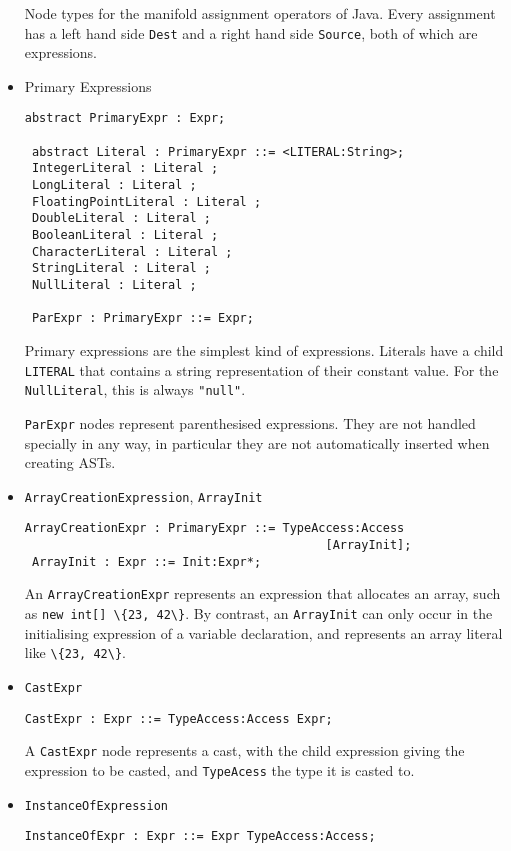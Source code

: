 \documentclass{article}
\newcommand{\nt}[1]{\texttt{#1}}
\newcommand{\child}[1]{\texttt{#1}}
\newcommand{\code}[1]{\lstinline$#1$}
\begin{document}
\begin{itemize}
  Node types for the manifold assignment operators of Java. Every assignment
  has a left hand side \nt{Dest} and a right hand side \nt{Source}, both
  of which are expressions.

\item Primary Expressions
  \begin{lstlisting}[frame=single]
 abstract PrimaryExpr : Expr;

 abstract Literal : PrimaryExpr ::= <LITERAL:String>;
 IntegerLiteral : Literal ;
 LongLiteral : Literal ;
 FloatingPointLiteral : Literal ;
 DoubleLiteral : Literal ;
 BooleanLiteral : Literal ;
 CharacterLiteral : Literal ;
 StringLiteral : Literal ;
 NullLiteral : Literal ;

 ParExpr : PrimaryExpr ::= Expr;
  \end{lstlisting}

  Primary expressions are the simplest kind of expressions. Literals
  have a child \nt{LITERAL} that contains a string representation of
  their constant value. For the \nt{NullLiteral}, this is always
  \code{"null"}.

  \nt{ParExpr} nodes represent parenthesised expressions. They are
  not handled specially in any way, in particular they are not
  automatically inserted when creating ASTs.

\item \nt{ArrayCreationExpression}, \nt{ArrayInit}
  \begin{lstlisting}[frame=single]
 ArrayCreationExpr : PrimaryExpr ::= TypeAccess:Access 
                                          [ArrayInit];
 ArrayInit : Expr ::= Init:Expr*;
  \end{lstlisting}

  An \nt{ArrayCreationExpr} represents an expression that allocates
  an array, such as \code{new int[] \{23, 42\}}. By contrast,
  an \nt{ArrayInit} can only occur in the initialising expression
  of a variable declaration, and represents an array literal like
  \code{\{23, 42\}}.

\item \nt{CastExpr}
  \begin{lstlisting}[frame=single]
 CastExpr : Expr ::= TypeAccess:Access Expr;
  \end{lstlisting}

  A \nt{CastExpr} node represents a cast, with the child expression
  giving the expression to be casted, and \child{TypeAcess} the type
  it is casted to.

\item \nt{InstanceOfExpression}
  \begin{lstlisting}[frame=single]
 InstanceOfExpr : Expr ::= Expr TypeAccess:Access;
  \end{lstlisting}


\end{itemize}
\end{document}
